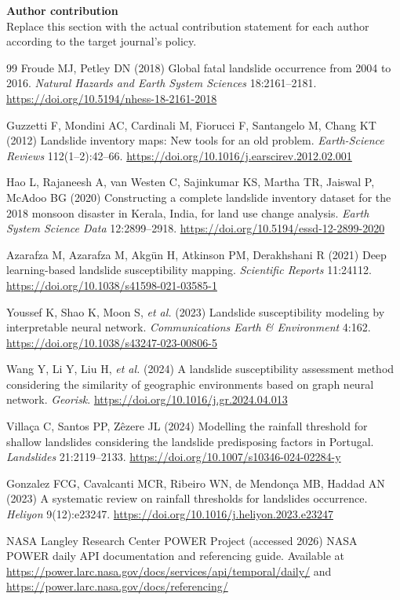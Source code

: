 \documentclass[pdflatex,sn-mathphys-num]{sn-jnl}
\begin{document}
\textbf{Author contribution}\\
Replace this section with the actual contribution statement for each author according to the target journal's policy.

\begin{thebibliography}{99}
Froude MJ, Petley DN (2018) Global fatal landslide occurrence from 2004 to 2016. \textit{Natural Hazards and Earth System Sciences} 18:2161--2181. \url{https://doi.org/10.5194/nhess-18-2161-2018}

Guzzetti F, Mondini AC, Cardinali M, Fiorucci F, Santangelo M, Chang KT (2012) Landslide inventory maps: New tools for an old problem. \textit{Earth-Science Reviews} 112(1--2):42--66. \url{https://doi.org/10.1016/j.earscirev.2012.02.001}

Hao L, Rajaneesh A, van Westen C, Sajinkumar KS, Martha TR, Jaiswal P, McAdoo BG (2020) Constructing a complete landslide inventory dataset for the 2018 monsoon disaster in Kerala, India, for land use change analysis. \textit{Earth System Science Data} 12:2899--2918. \url{https://doi.org/10.5194/essd-12-2899-2020}

Azarafza M, Azarafza M, Akg\"un H, Atkinson PM, Derakhshani R (2021) Deep learning-based landslide susceptibility mapping. \textit{Scientific Reports} 11:24112. \url{https://doi.org/10.1038/s41598-021-03585-1}

Youssef K, Shao K, Moon S, \textit{et al.} (2023) Landslide susceptibility modeling by interpretable neural network. \textit{Communications Earth \& Environment} 4:162. \url{https://doi.org/10.1038/s43247-023-00806-5}

Wang Y, Li Y, Liu H, \textit{et al.} (2024) A landslide susceptibility assessment method considering the similarity of geographic environments based on graph neural network. \textit{Georisk}. \url{https://doi.org/10.1016/j.gr.2024.04.013}

Villa\c{c}a C, Santos PP, Z\^ezere JL (2024) Modelling the rainfall threshold for shallow landslides considering the landslide predisposing factors in Portugal. \textit{Landslides} 21:2119--2133. \url{https://doi.org/10.1007/s10346-024-02284-y}

Gonzalez FCG, Cavalcanti MCR, Ribeiro WN, de Mendon\c{c}a MB, Haddad AN (2023) A systematic review on rainfall thresholds for landslides occurrence. \textit{Heliyon} 9(12):e23247. \url{https://doi.org/10.1016/j.heliyon.2023.e23247}

NASA Langley Research Center POWER Project (accessed 2026) NASA POWER daily API documentation and referencing guide. Available at \url{https://power.larc.nasa.gov/docs/services/api/temporal/daily/} and \url{https://power.larc.nasa.gov/docs/referencing/}
\end{thebibliography}
\end{document}
